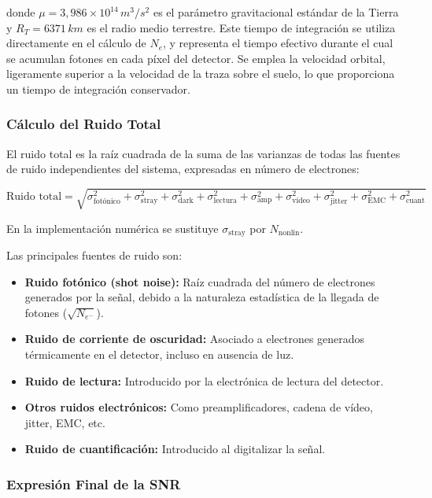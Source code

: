 donde \( \mu = 3{,}986 \times 10^{14} \, \si{m^3/s^2} \) es el parámetro gravitacional estándar de la Tierra y \( R_T = 6371 \, \si{km} \) es el radio medio terrestre. Este tiempo de integración se utiliza directamente en el cálculo de \( N_e \), y representa el tiempo efectivo durante el cual se acumulan fotones en cada píxel del detector. Se emplea la velocidad orbital, ligeramente superior a la velocidad de la traza sobre el suelo, lo que proporciona un tiempo de integración conservador.

\subsubsection{Cálculo del Ruido Total}

El ruido total es la raíz cuadrada de la suma de las varianzas de todas las fuentes de ruido independientes del sistema, expresadas en número de electrones:

\begin{equation}
\text{Ruido total} = \sqrt{\sigma_{\text{fotónico}}^2 + \sigma_{\text{stray}}^2 + \sigma_{\text{dark}}^2 + \sigma_{\text{lectura}}^2 + \sigma_{\text{amp}}^2 + \sigma_{\text{vídeo}}^2 + \sigma_{\text{jitter}}^2 + \sigma_{\text{EMC}}^2 + \sigma_{\text{cuant}}^2}
\end{equation}

En la implementación numérica se sustituye \(\sigma_{\text{stray}}\) por \(N_{\text{nonlin}}\).

Las principales fuentes de ruido son:

\begin{itemize}
    \item \textbf{Ruido fotónico (shot noise):} Raíz cuadrada del número de electrones generados por la señal, debido a la naturaleza estadística de la llegada de fotones (\( \sqrt{N_{e^-}} \)).
    \item \textbf{Ruido de corriente de oscuridad:} Asociado a electrones generados térmicamente en el detector, incluso en ausencia de luz.
    \item \textbf{Ruido de lectura:} Introducido por la electrónica de lectura del detector.
    \item \textbf{Otros ruidos electrónicos:} Como preamplificadores, cadena de vídeo, jitter, EMC, etc.
    \item \textbf{Ruido de cuantificación:} Introducido al digitalizar la señal.
\end{itemize}

\subsubsection{Expresión Final de la SNR}

